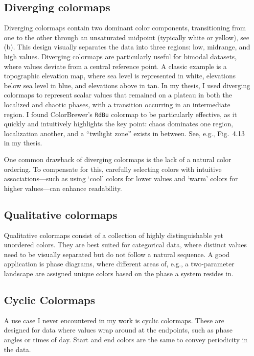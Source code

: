 \subsection{Diverging colormaps}
Diverging colormaps contain two dominant color components, transitioning from one to the other through an unsaturated midpoint (typically white or yellow), see (b). This design visually separates the data into three regions: low, midrange, and high values. Diverging colormaps are particularly useful for bimodal datasets, where values deviate from a central reference point. A classic example is a topographic elevation map, where sea level is represented in white, elevations below sea level in blue, and elevations above in tan.
In my thesis, I used diverging colormaps to represent scalar values that remained on a plateau in both the localized and chaotic phases, with a transition occurring in an intermediate region. I found ColorBrewer’s \texttt{RdBu} colormap to be particularly effective, as it quickly and intuitively highlights the key point: chaos dominates one region, localization another, and a ``twilight zone'' exists in between. See, e.g., Fig.~4.13 in my thesis.

One common drawback of diverging colormaps is the lack of a natural color ordering. To compensate for this, carefully selecting colors with intuitive associations---such as using `cool' colors for lower values and `warm' colors for higher values---can enhance readability.

\subsection{Qualitative colormaps}
Qualitative colormaps consist of a collection of highly distinguishable yet unordered colors. They are best suited for categorical data, where distinct values need to be visually separated but do not follow a natural sequence. A good application is phase diagrams, where different areas of, e.g., a two-parameter landscape are assigned unique colors based on the phase a system resides in.

\subsection{Cyclic Colormaps}
A use case I never encountered in my work is cyclic colormaps. These are designed for data where values wrap around at the endpoints, such as phase angles or times of day. Start and end colors are the same to convey periodicity in the data.


